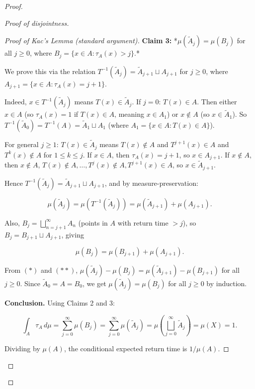 \begin{proof}
\begin{proof}[Proof of disjointness]
\begin{proof}[Proof of Kac's Lemma (standard argument)]
\textbf{Claim 3:} *$\mu(\widetilde{A}_j) = \mu(B_j)$ for all $j \ge 0$, where $B_j = \{x \in A : \tau_A(x) > j\}$.*

We prove this via the relation $T^{-1}(\widetilde{A}_j) = \widetilde{A}_{j+1} \sqcup A_{j+1}$ for $j \ge 0$, where $A_{j+1} = \{x \in A : \tau_A(x) = j+1\}$.

Indeed, $x \in T^{-1}(\widetilde{A}_j)$ means $T(x) \in \widetilde{A}_j$. If $j = 0$: $T(x) \in A$. Then either $x \in A$ (so $\tau_A(x) = 1$ if $T(x) \in A$, meaning $x \in A_1$) or $x \notin A$ (so $x \in \widetilde{A}_1$). So $T^{-1}(\widetilde{A}_0) = T^{-1}(A) = \widetilde{A}_1 \sqcup A_1$ (where $A_1 = \{x \in A : T(x) \in A\}$).

For general $j \ge 1$: $T(x) \in \widetilde{A}_j$ means $T(x) \notin A$ and $T^{j+1}(x) \in A$ and $T^k(x) \notin A$ for $1 \le k \le j$. If $x \in A$, then $\tau_A(x) = j+1$, so $x \in A_{j+1}$. If $x \notin A$, then $x \notin A$, $T(x) \notin A, \ldots, T^j(x) \notin A, T^{j+1}(x) \in A$, so $x \in \widetilde{A}_{j+1}$.

Hence $T^{-1}(\widetilde{A}_j) = \widetilde{A}_{j+1} \sqcup A_{j+1}$, and by measure-preservation:

\begin{equation}\label{eq:*}\tag{$*$}
\mu(\widetilde{A}_j) = \mu(T^{-1}(\widetilde{A}_j)) = \mu(\widetilde{A}_{j+1}) + \mu(A_{j+1}).
\end{equation}

Also, $B_j = \bigsqcup_{n=j+1}^\infty A_n$ (points in $A$ with return time $> j$), so $B_j = B_{j+1} \sqcup A_{j+1}$, giving

\begin{equation}\label{eq:**}\tag{$**$}
\mu(B_j) = \mu(B_{j+1}) + \mu(A_{j+1}).
\end{equation}

From $(*)$ and $(**)$, $\mu(\widetilde{A}_j) - \mu(B_j) = \mu(\widetilde{A}_{j+1}) - \mu(B_{j+1})$ for all $j \ge 0$. Since $\widetilde{A}_0 = A = B_0$, we get $\mu(\widetilde{A}_j) = \mu(B_j)$ for all $j \ge 0$ by induction.

\textbf{Conclusion.} Using Claims 2 and 3:

\[
\int_A \tau_A \, d\mu = \sum_{j=0}^{\infty} \mu(B_j) = \sum_{j=0}^{\infty} \mu(\widetilde{A}_j) = \mu\!\left(\bigsqcup_{j=0}^{\infty} \widetilde{A}_j\right) = \mu(X) = 1.
\]

Dividing by $\mu(A)$, the conditional expected return time is $1/\mu(A)$.
\end{proof}


\end{proof}

\end{proof}

